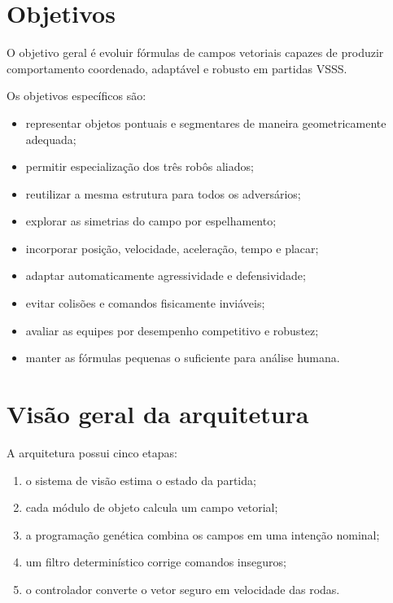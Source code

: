 \documentclass[12pt,a4paper]{article}
\begin{document}
\section{Objetivos}

O objetivo geral \'e evoluir f\'ormulas de campos vetoriais capazes de produzir comportamento coordenado, adapt\'avel e robusto em partidas VSSS.

Os objetivos espec\'ificos s\~ao:

\begin{itemize}
  \item representar objetos pontuais e segmentares de maneira geometricamente adequada;
  \item permitir especializa\c{c}\~ao dos tr\^es rob\^os aliados;
  \item reutilizar a mesma estrutura para todos os advers\'arios;
  \item explorar as simetrias do campo por espelhamento;
  \item incorporar posi\c{c}\~ao, velocidade, acelera\c{c}\~ao, tempo e placar;
  \item adaptar automaticamente agressividade e defensividade;
  \item evitar colis\~oes e comandos fisicamente invi\'aveis;
  \item avaliar as equipes por desempenho competitivo e robustez;
  \item manter as f\'ormulas pequenas o suficiente para an\'alise humana.
\end{itemize}

\section{Vis\~ao geral da arquitetura}

A arquitetura possui cinco etapas:

\begin{enumerate}
  \item o sistema de vis\~ao estima o estado da partida;
  \item cada m\'odulo de objeto calcula um campo vetorial;
  \item a programa\c{c}\~ao gen\'etica combina os campos em uma inten\c{c}\~ao nominal;
  \item um filtro determin\'istico corrige comandos inseguros;
  \item o controlador converte o vetor seguro em velocidade das rodas.
\end{enumerate}
\end{document}

